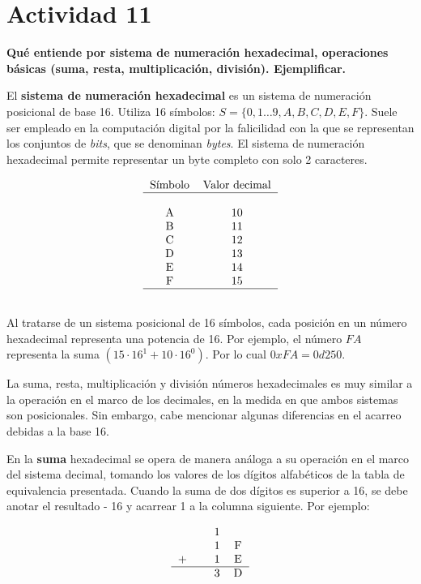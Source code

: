 \section*{Actividad 11}
\textbf{Qué entiende por sistema de numeración hexadecimal, operaciones básicas (suma, resta, multiplicación, división). Ejemplificar.}

El \textbf{sistema de numeración hexadecimal} es un sistema de numeración posicional de base 16. Utiliza 16 símbolos: $S=\{0,1 \dots 9, A, B, C, D, E, F\}$. Suele ser empleado en la computación digital por la falicilidad con la que se representan los conjuntos de \textit{bits}, que se denominan \textit{bytes}. El sistema de numeración hexadecimal permite representar un byte completo con solo 2 caracteres.

\begin{align*}
\begin{tabular}{ cc }
	Símbolo	&	Valor decimal	\\
	\hline						\\
		A	&		10			\\
		B	&		11			\\
		C	&		12			\\
		D	&		13			\\
		E	&		14			\\
		F	&		15			\\
	\hline						\\
\end{tabular}
\end{align*}

Al tratarse de un sistema posicional de 16 símbolos, cada posición en un número hexadecimal representa una potencia de 16. Por ejemplo, el número $FA$ representa la suma $(15 \cdot 16^{1} + 10 \cdot 16^{0})$. Por lo cual $0xFA = 0d250$. 

La suma, resta, multiplicación y división números hexadecimales es muy similar a la operación en el marco de los decimales, en la medida en que ambos sistemas son posicionales. Sin embargo, cabe mencionar algunas diferencias en el acarreo debidas a la base 16.

En la \textbf{suma} hexadecimal se opera de manera análoga a su operación en el marco del sistema decimal, tomando los valores de los dígitos alfabéticos de la tabla de equivalencia presentada. Cuando la suma de dos dígitos es superior a 16, se debe anotar el resultado - 16 y acarrear 1 a la columna siguiente. Por ejemplo:

\begin{align*}
\begin{tabular}{cccc}
	  &   & 1 &   \\
	  &   & 1 & F \\
	+ &   & 1 & E \\
\hline
	  &   & 3 & D \\
\end{tabular}
\end{align*}

